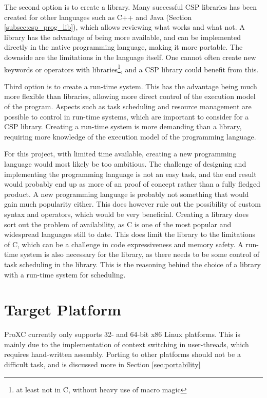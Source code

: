 The second option is to create a library. Many successful CSP libraries has been created for other languages such as C++ and Java (Section \ref{subsec:csp_prog_lib}), which allows reviewing what works and what not. A library has the advantage of being more available, and can be implemented directly in the native programming language, making it more portable. The downside are the limitations in the language itself. One cannot often create new keywords or operators with libraries\footnote{at least not in C, without heavy use of macro magic}, and a CSP library could benefit from this. 

Third option is to create a run\hyp{}time system. This has the advantage being much more flexible than libraries, allowing more direct control of the execution model of the program. Aspects such as task scheduling and resource management are possible to control in run\hyp{}time systems, which are important to consider for a CSP library. Creating a run-time system is more demanding than a library, requiring more knowledge of the execution model of the programming language.

For this project, with limited time available, creating a new programming language would most likely be too ambitious. The challenge of designing and implementing the programming language is not an easy task, and the end result would probably end up as more of an proof of concept rather than a fully fledged product. A new programming language is probably not something that would gain much popularity either. This does however rule out the possibility of custom syntax and operators, which would be very beneficial. Creating a library does sort out the problem of availability, as C is one of the most popular and widespread languages still to date. This does limit the library to the limitations of C, which can be a challenge in code expressiveness and memory safety. A run\hyp{}time system is also necessary for the library, as there needs to be some control of task scheduling in the library. This is the reasoning behind the choice of a library with a run\hyp{}time system for scheduling.


\section{Target Platform}
\label{sec:proxc_target_platform}

ProXC currently only supports 32\hyp{} and 64\hyp{}bit x86 Linux platforms. This is mainly due to the implementation of context switching in user\hyp{}threads, which requires hand\hyp{}written assembly. Porting to other platforms should not be a difficult task, and is discussed more in Section \ref{sec:portability}


